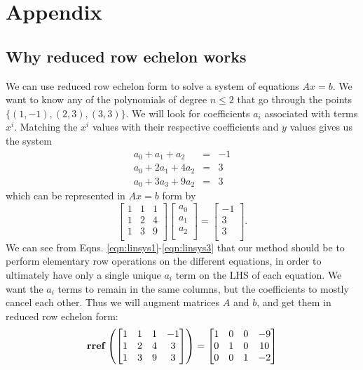 \documentclass[10pt,letterpaper]{article}
\begin{document}
\section{Appendix}
\label{sec-2}
\subsection{Why reduced row echelon works}
\label{sec-2_1}

We can use reduced row echelon form to solve a system of equations $Ax=b$. We want to know any of the polynomials of degree $n \le 2$ that go through the points $\{ (1,-1), (2,3), (3,3)\}$. We will look for coefficients $a_i$ associated with terms $x^i$. Matching the $x^i$ values with their respective coefficients and $y$ values gives us the system
 \begin{eqnarray}
 \label{eqn:linsys1}
   a_0 + a_1 + a_2 &=& -1 \\
   a_0 + 2a_1 + 4a_2 &=& 3 \\
   a_0 + 3a_3 + 9a_2 &=& 3
 \label{eqn:linsys3}
 \end{eqnarray}
which can be represented in $Ax=b$ form by
$$
\begin{bmatrix}
  1 & 1 & 1 \\
  1 & 2 & 4 \\
  1 & 3 & 9 \\
\end{bmatrix}
\begin{bmatrix}
  a_0 \\
  a_1 \\
  a_2 \\
\end{bmatrix}
=
\begin{bmatrix}
  -1 \\
   3 \\
   3 \\
\end{bmatrix}.
$$ 
We can see from Eqns. \eqref{eqn:linsys1}-\eqref{eqn:linsys3} that our method should be to perform elementary row operations on the different equations, in order to ultimately have only a single unique $a_i$ term on the LHS of each equation. We want the $a_i$ terms to remain in the same columns, but the coefficients to mostly cancel each other. Thus we will augment matrices $A$ and $b$, and get them in reduced row echelon form:
$$
{\bf rref} \left(
\begin{bmatrix}
  1 & 1 & 1 & -1 \\
  1 & 2 & 4 &  3 \\
  1 & 3 & 9 &  3 \\
\end{bmatrix}
\right) =
\begin{bmatrix}
  1 & 0 & 0 & -9 \\
  0 & 1 & 0 & 10 \\
  0 & 0 & 1 & -2 
\label{solved}
\end{bmatrix}
$$
\end{document}
